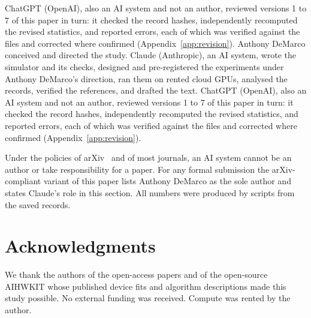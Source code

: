 ChatGPT (OpenAI), also an AI system and not an author, reviewed versions 1 to 7 of this paper in turn: it checked the
record hashes, independently recomputed the revised statistics, and reported errors, each of which was verified against
the files and corrected where confirmed (Appendix~\ref{app:revision}).
\else
Anthony DeMarco conceived and directed the study. Claude (Anthropic), an AI system, wrote the simulator and its checks, designed and
pre-registered the experiments under Anthony DeMarco's direction, ran them on rented cloud GPUs, analysed the records, verified the
references, and drafted the text. ChatGPT (OpenAI), also an AI system and not an author, reviewed versions 1 to 7 of this paper in turn: it checked the
record hashes, independently recomputed the revised statistics, and reported errors, each of which was verified against
the files and corrected where confirmed (Appendix~\ref{app:revision}).

Under the policies of arXiv~\cite{arxiv_policy} and of most journals, an AI system cannot be an author or take responsibility
for a paper. For any formal submission the arXiv-compliant variant of this paper lists Anthony DeMarco as the sole author and states
Claude's role in this section. All numbers were produced by scripts from the saved records.
\fi

\section*{Acknowledgments}
We thank the authors of the open-access papers and of the open-source AIHWKIT whose published device fits and algorithm
descriptions made this study possible. No external funding was received. Compute was rented by the author.




\appendix







